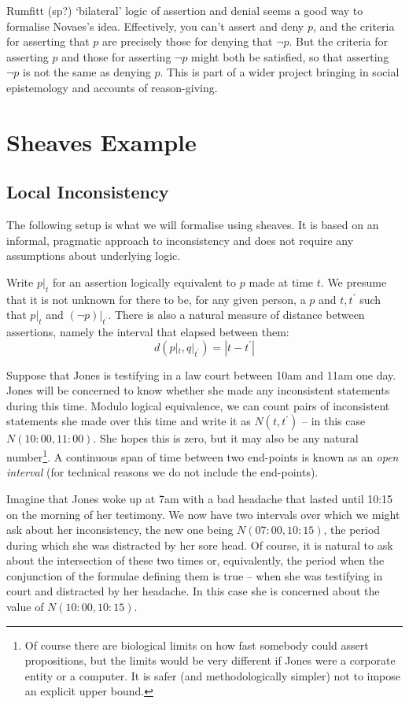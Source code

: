 \documentclass[oneside,english]{article}
\theoremstyle{plain}
\theoremstyle{definition}
\theoremstyle{definition}
\begin{document}
Rumfitt (sp?) `bilateral' logic of assertion and denial seems a good way to formalise Novaes's idea. Effectively, you can't assert and deny $p$, and the criteria for asserting that $p$ are precisely those for denying that $\lnot p$. But the criteria for asserting $p$ and those for asserting $\lnot p$ might both be satisfied, so that asserting $\lnot p$ is not the same as denying $p$. This is part of a wider project bringing in social epistemology and accounts of reason-giving.

\section{Sheaves Example}

\subsection{Local Inconsistency}

The following setup is what we will formalise using sheaves. It is based on an informal, pragmatic approach to inconsistency and does not require any assumptions about underlying logic.

Write $p|_t$ for an assertion logically equivalent to $p$ made at time $t$. We presume that it is not unknown for there to be, for any given person, a $p$ and $t, t^\prime$ such that $p|_t$ and $(\lnot p)|_{t^\prime}$. There is also a natural measure of distance between assertions, namely the interval that elapsed between them:
\[
	d(p|_t, q|_{t^\prime}) = |t - t^\prime|
\]

Suppose that Jones is testifying in a law court between 10am and 11am one day. Jones will be concerned to know whether she made any inconsistent statements during this time. Modulo logical equivalence, we can count pairs of inconsistent statements she made over this time and write it as $N(t, t^\prime)$ -- in this case $N(10:00, 11:00)$. She hopes this is zero, but it may also be any natural number\footnote{Of course there are biological limits on how fast somebody could assert propositions, but the limits would be very different if Jones were a corporate entity or a computer. It is safer (and methodologically simpler) not to impose an explicit upper bound.}. A continuous span of time between two end-points is known as an \emph{open interval} (for technical reasons we do not include the end-points). 

Imagine that Jones woke up at 7am with a bad headache that lasted until 10:15 on the morning of her testimony. We now have two intervals over which we might ask about her inconsistency, the new one being $N(07:00, 10:15)$, the period during which she was distracted by her sore head. Of course, it is natural to ask about the intersection of these two times or, equivalently, the period when the conjunction of the formulae defining them 
is true -- when she was testifying in court and distracted by her headache. In this case she is concerned about the value of $N(10:00, 10:15)$. 
\end{document}
